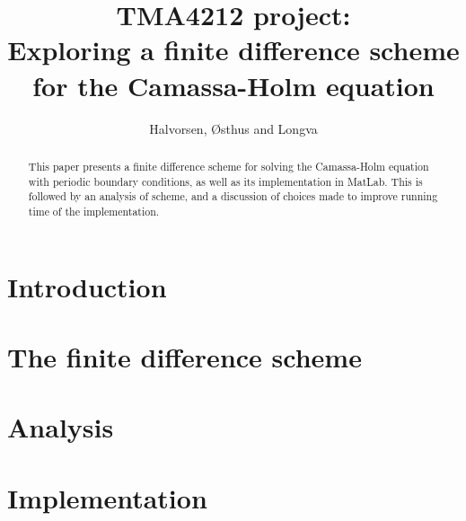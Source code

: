 \documentclass{article}
\title{TMA4212 project: \\ Exploring a finite difference scheme for the Camassa-Holm equation}
\author{Halvorsen, Østhus and Longva}
\begin{document}
\maketitle

\begin{abstract}
This paper presents a finite difference scheme for solving the Camassa-Holm equation with periodic boundary conditions, as well as its implementation in MatLab. This is followed by an analysis of scheme, and a discussion of choices made to improve running time of the implementation. 
\end{abstract}


\section*{Introduction}


\newpage

\section*{The finite difference scheme}



%

\newpage

\section*{Analysis}



\section*{Implementation}



{}

\end{document}
